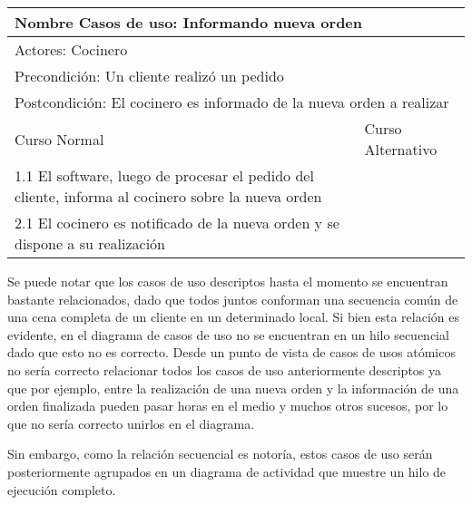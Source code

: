 \documentclass[a4paper,10pt]{article}
\begin{document}
\bigskip

\begin{center}
\begin{tabularx}{14cm}{|X|X|}
\hline
\multicolumn{2}{|l|}{Nombre Casos de uso: Informando nueva orden}\\
\hline
\multicolumn{2}{|l|}{Actores: Cocinero}\\
\hline
\multicolumn{2}{|l|}{Precondici\'on: Un cliente realiz\'o un pedido}\\
\hline
\multicolumn{2}{|l|}{Postcondici\'on: El cocinero es informado de la nueva orden a realizar}\\
\hline
Curso Normal & Curso Alternativo\\
\hline
1.1 El software, luego de procesar el pedido del cliente, informa al cocinero sobre la nueva orden & 
\\
\hline
2.1 El cocinero es notificado de la nueva orden y se dispone a su realizaci\'on & 
\\
\hline
\end{tabularx}
\end{center}


\medskip

Se puede notar que los casos de uso descriptos hasta el momento se encuentran bastante relacionados, dado que todos juntos conforman una secuencia
com\'un de una cena completa de un cliente en un determinado local. Si bien esta relaci\'on es evidente, en el diagrama de casos de uso no se encuentran
en un hilo secuencial dado que esto no es correcto. Desde un punto de vista de casos de usos at\'omicos no ser\'ia correcto relacionar todos los casos de uso
anteriormente descriptos ya que por ejemplo, entre la realizaci\'on de una nueva orden y la informaci\'on de una orden finalizada pueden pasar horas
en el medio y muchos otros sucesos, por lo que no ser\'ia correcto unirlos en el diagrama.


Sin embargo, como la relaci\'on secuencial es notor\'ia, estos casos de uso ser\'an posteriormente agrupados en un diagrama de actividad que muestre
un hilo de ejecuci\'on completo.

\bigskip
\end{document}
